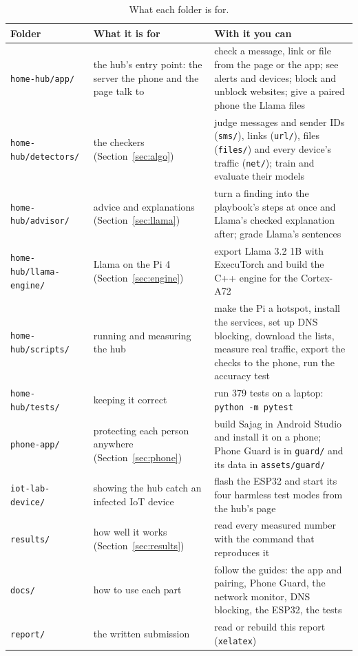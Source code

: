 \documentclass[11pt,a4paper]{article}
\newcommand{\code}[1]{\texttt{#1}}
\begin{document}
\begin{table}[H]
\centering\small
\begin{tabularx}{\textwidth}{@{}>{\raggedright\arraybackslash}p{4.3cm}>{\raggedright\arraybackslash}p{3.4cm}X@{}}
\toprule
\textbf{Folder} & \textbf{What it is for} & \textbf{With it you can}\\
\midrule
\code{home-hub/app/} & the hub's entry point: the server the phone and the page talk to & check a message, link or file from the page or the app; see alerts and devices; block and unblock websites; give a paired phone the Llama files\\
\code{home-hub/detectors/} & the checkers (Section~\ref{sec:algo}) & judge messages and sender IDs (\code{sms/}), links (\code{url/}), files (\code{files/}) and every device's traffic (\code{net/}); train and evaluate their models\\
\code{home-hub/advisor/} & advice and explanations (Section~\ref{sec:llama}) & turn a finding into the playbook's steps at once and Llama's checked explanation after; grade Llama's sentences\\
\code{home-hub/llama-engine/} & Llama on the Pi 4 (Section~\ref{sec:engine}) & export Llama 3.2 1B with ExecuTorch and build the C++ engine for the Cortex-A72\\
\code{home-hub/scripts/} & running and measuring the hub & make the Pi a hotspot, install the services, set up DNS blocking, download the lists, measure real traffic, export the checks to the phone, run the accuracy test\\
\code{home-hub/tests/} & keeping it correct & run 379 tests on a laptop: \code{python -m pytest}\\
\code{phone-app/} & protecting each person anywhere (Section~\ref{sec:phone}) & build Sajag in Android Studio and install it on a phone; Phone Guard is in \code{guard/} and its data in \code{assets/guard/}\\
\code{iot-lab-device/} & showing the hub catch an infected IoT device & flash the ESP32 and start its four harmless test modes from the hub's page\\
\code{results/} & how well it works (Section~\ref{sec:results}) & read every measured number with the command that reproduces it\\
\code{docs/} & how to use each part & follow the guides: the app and pairing, Phone Guard, the network monitor, DNS blocking, the ESP32, the tests\\
\code{report/} & the written submission & read or rebuild this report (\code{xelatex})\\
\bottomrule
\end{tabularx}
\caption{What each folder is for.}
\end{table}
\end{document}
